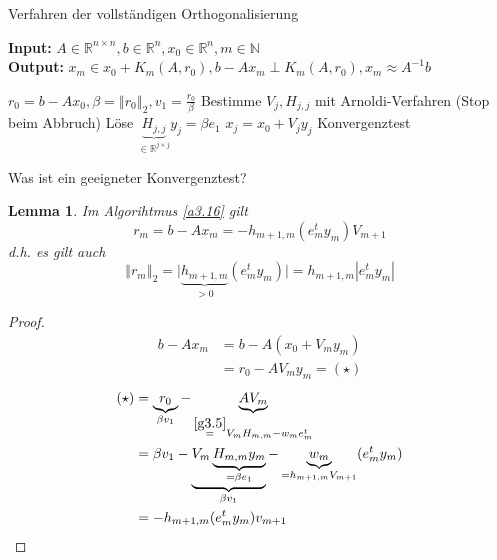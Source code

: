 \documentclass{book}
\newtheorem{lemma}[algorithm]{Lemma}
\def\R{\mathbb{R}}
\def\N{\mathbb{N}}
\begin{document}
            \begin{algorithm}[H]\label{a3.16}
                \caption{Verfahren der vollständigen Orthogonalisierung}
                \textbf{Input:} $A\in\R^{n\times n},b\in\R^n,x_0\in\R^n,m\in\N$\\
                \textbf{Output:} $x_m\in x_0+K_m(A,r_0),b-Ax_m\perp K_m(A,r_0), x_m\approx A^{-1}b$
                \begin{algorithmic}
                \State $r_0=b-Ax_0,\beta=\left\Vert r_0 \right\Vert_2,v_1=\frac{r_0}{\beta}$
                    \State Bestimme $V_j, H_{j,j}$ mit Arnoldi-Verfahren (Stop beim Abbruch)
                    \State Löse $\underbrace{H_{j,j}}_{\in\R^{j\times j}}y_j = \beta e_1$
                    \State $x_j=x_0+V_jy_j$
                    \State Konvergenztest
                \EndFor
                \end{algorithmic}
            \end{algorithm}

            Was ist ein geeigneter Konvergenztest?

            \begin{lemma}\label{l3.17}
                Im Algorihtmus \ref{a3.16} gilt 
                \[r_m=b-Ax_m=-h_{m+1,m}(e_m^ty_m)V_{m+1}\]
                d.h. es gilt auch 
                \[
                    \left\Vert r_m \right\Vert_2 = \vert \underbrace{h_{m+1,m}}_{>0} (e^t_m y_m)\vert = h_{m+1,m} \left\vert e_m^ty_m \right\vert    
                \]
            \end{lemma}

            \begin{proof}
                \begin{align*}
                    b-Ax_m&=b-A(x_0+V_my_m)\\
                    &= r_0-  AV_my_m = (\star)
                \end{align*}
                \begin{align*}
                    (\star)&= \underbrace{r_0}_{\beta v_1}-\underbrace{AV_m}_{\stackrel{\ref{g3.5}}{=}V_mH_{m,m}-w_me_m^t}\\
                     &= \beta v_1 - \underbrace{V_m\underbrace{H_{m,m}y_m}_{=\beta e_1}}_{\beta v_1}- \underbrace{w_m}_{=h_{m+1,m}V_{m+1}}(e_m^ty_m)\\
                     &= -h_{m+1,m}(e_m^ty_m)v_{m+1}
                \end{align*}
            \end{proof}
\end{document}
